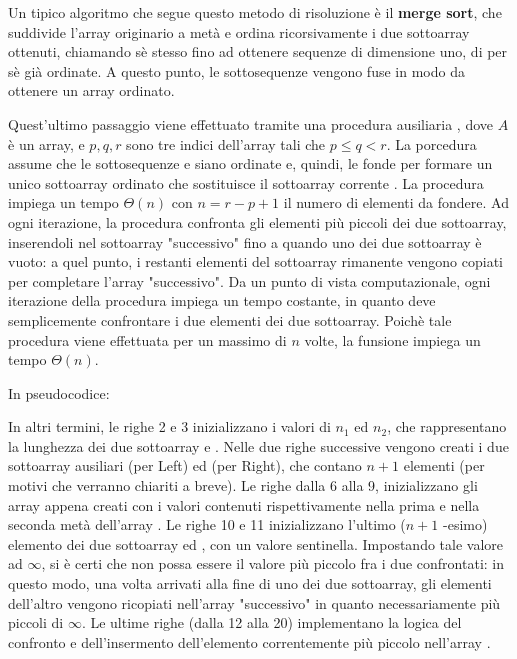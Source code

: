 Un tipico algoritmo che segue questo metodo di risoluzione è il \textbf{merge sort}, che suddivide l'array originario a metà e ordina ricorsivamente i due sottoarray ottenuti, chiamando sè stesso fino ad ottenere sequenze di dimensione uno, di per sè già ordinate. A questo punto, le sottosequenze vengono fuse in modo da ottenere un array ordinato. 

Quest'ultimo passaggio viene effettuato tramite una procedura ausiliaria , dove \(A\) è un array, e \(p,q,r\) sono tre indici dell'array tali che \(p\le q < r\).
La porcedura assume che le sottosequenze  e  siano ordinate e, quindi, le fonde per formare un unico sottoarray ordinato che sostituisce il sottoarray corrente . La procedura  impiega un tempo \(\Theta(n)\) con \(n=r-p+1\) il numero di elementi da fondere. Ad ogni iterazione, la procedura  confronta gli elementi più piccoli dei due sottoarray, inserendoli nel sottoarray "successivo" fino a quando uno dei due sottoarray è vuoto: a quel punto, i restanti elementi del sottoarray rimanente vengono copiati per completare l'array "successivo". Da un punto di vista computazionale, ogni iterazione della procedura impiega un tempo costante, in quanto deve semplicemente confrontare i due elementi dei due sottoarray. Poichè tale procedura viene effettuata per un massimo di \(n\) volte, la funsione impiega un tempo \(\Theta(n)\).

In pseudocodice:



\noindent
In altri termini, le righe 2 e 3 inizializzano i valori di \(n_1\) ed \(n_2\), che rappresentano la lunghezza dei due sottoarray  e . Nelle due righe successive vengono creati i due sottoarray ausiliari  (per Left) ed  (per Right), che contano \(n+1\) elementi (per motivi che verranno chiariti a breve). Le righe dalla 6 alla 9, inizializzano gli array appena creati con i valori contenuti rispettivamente nella prima e nella seconda metà dell'array . Le righe 10 e 11 inizializzano l'ultimo (\(n+1\) -esimo) elemento dei due sottoarray  ed , con un valore sentinella. Impostando tale valore ad \(\infty\), si è certi che non possa essere il valore più piccolo fra i due confrontati: in questo modo, una volta arrivati alla fine di uno dei due sottoarray, gli elementi dell'altro vengono ricopiati nell'array "successivo" in quanto necessariamente più piccoli di \(\infty\). Le ultime righe (dalla 12 alla 20) implementano la logica del confronto e dell'insermento dell'elemento correntemente più piccolo nell'array .

